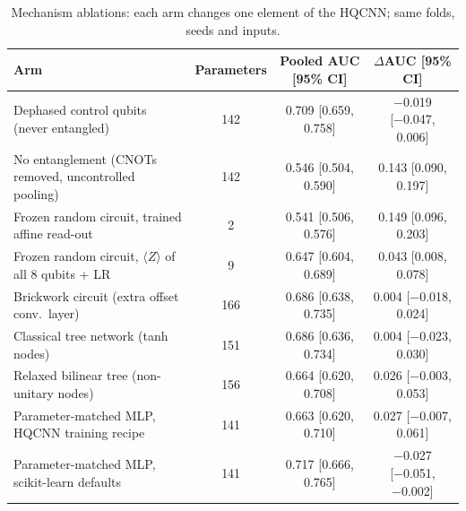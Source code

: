 \begin{table}[tbp]
\centering
\caption{Mechanism ablations: each arm changes one element of the HQCNN; same folds, seeds and inputs.}
\label{tab:main_ablations}
\small
\begin{tabular}{>{\raggedright\arraybackslash}p{7.8cm}ccc}
\toprule
Arm & Parameters & Pooled AUC [95\% CI] & $\Delta$AUC [95\% CI] \\
\midrule
Dephased control qubits (never entangled) & \num{142} & \num{0.709} [\num{0.659}, \num{0.758}] & \num{-0.019} [\num{-0.047}, \num{+0.006}] \\
No entanglement (CNOTs removed, uncontrolled pooling) & \num{142} & \num{0.546} [\num{0.504}, \num{0.590}] & \num{+0.143} [\num{+0.090}, \num{+0.197}] \\
Frozen random circuit, trained affine read-out & \num{2} & \num{0.541} [\num{0.506}, \num{0.576}] & \num{+0.149} [\num{+0.096}, \num{+0.203}] \\
Frozen random circuit, $\langle Z\rangle$ of all 8 qubits + LR & \num{9} & \num{0.647} [\num{0.604}, \num{0.689}] & \num{+0.043} [\num{+0.008}, \num{+0.078}] \\
Brickwork circuit (extra offset conv.\ layer) & \num{166} & \num{0.686} [\num{0.638}, \num{0.735}] & \num{+0.004} [\num{-0.018}, \num{+0.024}] \\
Classical tree network (tanh nodes) & \num{151} & \num{0.686} [\num{0.636}, \num{0.734}] & \num{+0.004} [\num{-0.023}, \num{+0.030}] \\
Relaxed bilinear tree (non-unitary nodes) & \num{156} & \num{0.664} [\num{0.620}, \num{0.708}] & \num{+0.026} [\num{-0.003}, \num{+0.053}] \\
Parameter-matched MLP, HQCNN training recipe & \num{141} & \num{0.663} [\num{0.620}, \num{0.710}] & \num{+0.027} [\num{-0.007}, \num{+0.061}] \\
Parameter-matched MLP, scikit-learn defaults & \num{141} & \num{0.717} [\num{0.666}, \num{0.765}] & \num{-0.027} [\num{-0.051}, \num{-0.002}] \\
\bottomrule
\end{tabular}
\par{}
\end{table}
